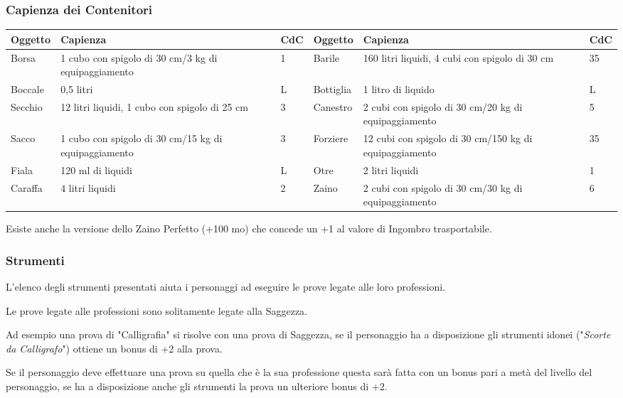 \documentclass[12pt,a4paper,twoside,openany]{book}
\begin{document}
\subsubsection{Capienza dei Contenitori}

\begin{tabularx}{0.95\textwidth}{lXl|lXl}
\textbf{Oggetto}&\textbf{Capienza}&\textbf{CdC}&\textbf{Oggetto}&\textbf{Capienza}&\textbf{CdC}\\
\toprule
Borsa&1 cubo con spigolo di 30 cm/3 kg di equipaggiamento&1&Barile&160 litri liquidi, 4 cubi con spigolo di 30 cm&35\\
Boccale&0,5 litri&L&Bottiglia&1 litro di liquido&L\\
Secchio&12 litri liquidi, 1 cubo con spigolo di 25 cm&3&Canestro&2 cubi con spigolo di 30 cm/20 kg di equipaggiamento&5\\
Sacco&1 cubo con spigolo di 30 cm/15 kg di equipaggiamento&3&Forziere&12 cubi con spigolo di 30 cm/150 kg di equipaggiamento&35\\
Fiala&120 ml di liquidi&L&Otre&2 litri liquidi&1\\
Caraffa&4 litri liquidi&2&Zaino&2 cubi con spigolo di 30 cm/30 kg di equipaggiamento&6\\
\end{tabularx}


\medskip

Esiste anche la versione dello Zaino Perfetto (+100 mo) che concede un +1 al valore di Ingombro trasportabile.

\begin{multicols}{2}

\subsubsection{Strumenti}

L'elenco degli strumenti presentati aiuta i personaggi ad eseguire le prove legate alle loro professioni.

Le prove legate alle professioni sono solitamente legate alla Saggezza.

Ad esempio una prova di "Calligrafia" si risolve con una prova di Saggezza, se il personaggio ha a disposizione gli strumenti idonei ("\textit{Scorte da Calligrafo}") ottiene un bonus di +2 alla prova.

Se il personaggio deve effettuare una prova su quella che è la sua professione questa sarà fatta con un bonus pari a metà del livello del personaggio, se ha a disposizione anche gli strumenti la prova un ulteriore bonus di +2.

\end{multicols}
\end{document}
